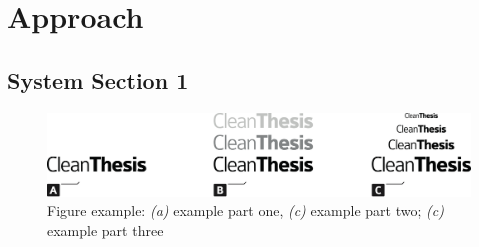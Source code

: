 %
\chapter{Approach}
\label{sec:approach}


\section{System Section 1}
\label{sec:approach:sec1}

\begin{figure}[htb]
	\includegraphics[width=\textwidth]{gfx/Clean-Thesis-Figure}
	\caption{Figure example: \textit{(a)} example part one, \textit{(c)} example part two; \textit{(c)} example part three}
	\label{fig:system:example1}
\end{figure}


